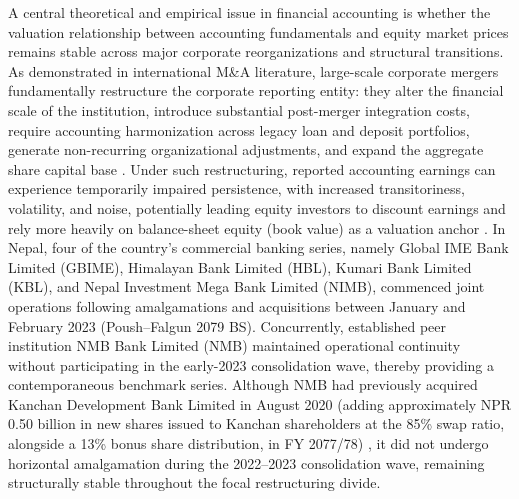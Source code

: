 A central theoretical and empirical issue in financial accounting is whether the valuation relationship between accounting fundamentals and equity market prices remains stable across major corporate reorganizations and structural transitions. As demonstrated in international M\&A literature, large-scale corporate mergers fundamentally restructure the corporate reporting entity: they alter the financial scale of the institution, introduce substantial post-merger integration costs, require accounting harmonization across legacy loan and deposit portfolios, generate non-recurring organizational adjustments, and expand the aggregate share capital base \citep{kwon2020}. Under such restructuring, reported accounting earnings can experience temporarily impaired persistence, with increased transitoriness, volatility, and noise, potentially leading equity investors to discount earnings and rely more heavily on balance-sheet equity (book value) as a valuation anchor \citep{collins1997}. In Nepal, four of the country's commercial banking series, namely Global IME Bank Limited (GBIME), Himalayan Bank Limited (HBL), Kumari Bank Limited (KBL), and Nepal Investment Mega Bank Limited (NIMB), commenced joint operations following amalgamations and acquisitions between January and February 2023 (Poush--Falgun 2079 BS). Concurrently, established peer institution NMB Bank Limited (NMB) maintained operational continuity without participating in the early-2023 consolidation wave, thereby providing a contemporaneous benchmark series. Although NMB had previously acquired Kanchan Development Bank Limited in August 2020 (adding approximately NPR 0.50 billion in new shares issued to Kanchan shareholders at the 85\% swap ratio, alongside a 13\% bonus share distribution, in FY 2077/78) \citep{nmb2021report}, it did not undergo horizontal amalgamation during the 2022--2023 consolidation wave, remaining structurally stable throughout the focal restructuring divide.

